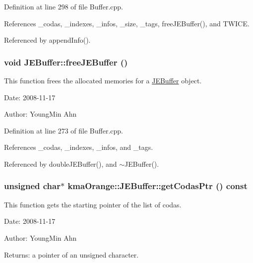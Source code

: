 Definition at line 298 of file Buffer.cpp.

References \_\-codas, \_\-indexes, \_\-infos, \_\-size, \_\-tags, freeJEBuffer(), and TWICE.

Referenced by appendInfo().\hypertarget{classkmaOrange_1_1JEBuffer_516f7964ac619106e7a8f5aef02bd3a0}{
\subsubsection[{freeJEBuffer}]{\setlength{\rightskip}{0pt plus 5cm}void JEBuffer::freeJEBuffer ()}}
\label{classkmaOrange_1_1JEBuffer_516f7964ac619106e7a8f5aef02bd3a0}


This function frees the allocated memories for a \hyperlink{classkmaOrange_1_1JEBuffer}{JEBuffer} object. 

\begin{Desc}
\item[Date:]2008-11-17 \end{Desc}
\begin{Desc}
\item[Author:]YoungMin Ahn \end{Desc}


Definition at line 273 of file Buffer.cpp.

References \_\-codas, \_\-indexes, \_\-infos, and \_\-tags.

Referenced by doubleJEBuffer(), and $\sim$JEBuffer().\hypertarget{classkmaOrange_1_1JEBuffer_f7132e64eb9c4392442b8b34112ec88a}{
\subsubsection[{getCodasPtr}]{\setlength{\rightskip}{0pt plus 5cm}unsigned char$\ast$ kmaOrange::JEBuffer::getCodasPtr () const}}
\label{classkmaOrange_1_1JEBuffer_f7132e64eb9c4392442b8b34112ec88a}


This function gets the starting pointer of the list of codas. 

\begin{Desc}
\item[Date:]2008-11-17 \end{Desc}
\begin{Desc}
\item[Author:]YoungMin Ahn \end{Desc}
\begin{Desc}
\item[Returns:]a pointer of an unsigned character. \end{Desc}


